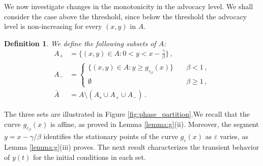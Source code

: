 \documentclass{article}
\newtheorem{definition}{Definition}[section]
\begin{document}
We now investigate changes in the monotonicity in the advocacy level. We shall consider the case above the threshold, since below the threshold the advocacy level is non-increasing for every $(x,y)$ in $A$.


\begin{definition}
    We define the following subsets of $A$:
    $$
    \begin{aligned}
    A_+ & = \Big\{(x,y)\in A: 0 < y < x - \displaystyle\frac{\gamma}{\beta}\Big\}\,, \\
    A_- & = 
    \begin{cases}
    \{(x,y) \in A: y \ge g_{\varepsilon_\beta}(x)\} \quad & \beta < 1\,,\\
    \emptyset & \beta \ge 1\,,
    \end{cases}\\
\bar A & = A \setminus (A_s \cup A_+ \cup A_-)\,.
\end{aligned}
$$
\end{definition}

The three sets are illustrated in Figure \ref{fig:phase_partition}.We recall that the curve $g_{\varepsilon_\beta}(x)$ is affine, as proved in Lemma \ref{lemma:g}(ii). Moreover, the segment $y = x - \gamma/\beta$ identifies the stationary points of the curve $g_\varepsilon(x)$ as $\varepsilon$ varies, as Lemma \ref{lemma:g}(iii) proves. The next result characterizes the transient behavior of $y(t)$ for the initial conditions in each set.
\end{document}
